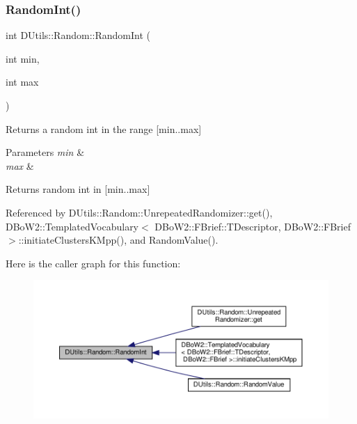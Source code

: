 \subsubsection{\texorpdfstring{Random\+Int()}{RandomInt()}}
{\footnotesize\ttfamily int D\+Utils\+::\+Random\+::\+Random\+Int (\begin{DoxyParamCaption}\item[{int}]{min,  }\item[{int}]{max }\end{DoxyParamCaption})\hspace{0.3cm}{\ttfamily [static]}}

Returns a random int in the range \mbox{[}min..max\mbox{]} 
\begin{DoxyParams}{Parameters}
{\em min} & \\
\hline
{\em max} & \\
\hline
\end{DoxyParams}
\begin{DoxyReturn}{Returns}
random int in \mbox{[}min..max\mbox{]} 
\end{DoxyReturn}


Referenced by D\+Utils\+::\+Random\+::\+Unrepeated\+Randomizer\+::get(), D\+Bo\+W2\+::\+Templated\+Vocabulary$<$ D\+Bo\+W2\+::\+F\+Brief\+::\+T\+Descriptor, D\+Bo\+W2\+::\+F\+Brief $>$\+::initiate\+Clusters\+K\+Mpp(), and Random\+Value().

Here is the caller graph for this function\+:\nopagebreak
\begin{figure}[H]
\begin{center}
\leavevmode
\includegraphics[width=350pt]{classDUtils_1_1Random_aa25012101ecbca54025d5430bcf93d86_icgraph}
\end{center}
\end{figure}
\mbox{\label{classDUtils_1_1Random_ac5d2e4d977afdec30071c531a7a96d88}} 
